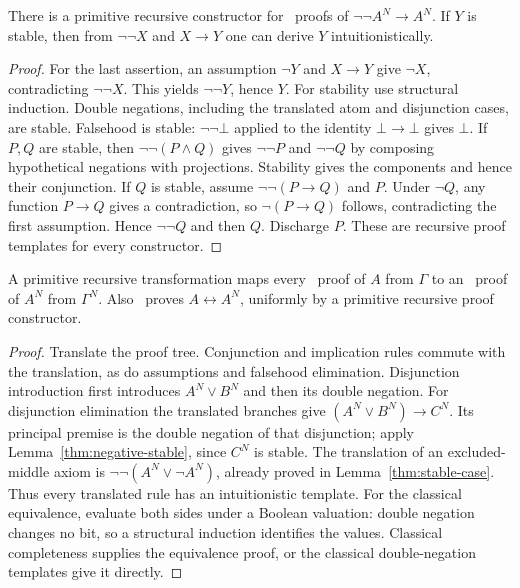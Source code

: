 \begin{lemma}\label{thm:negative-stable}
There is a primitive recursive constructor for \IPC\ proofs of
$\neg\neg A^N\to A^N$. If $Y$ is stable, then from $\neg\neg X$ and
$X\to Y$ one can derive $Y$ intuitionistically.
\end{lemma}
\begin{proof}
For the last assertion, an assumption $\neg Y$ and $X\to Y$ give
$\neg X$, contradicting $\neg\neg X$. This yields $\neg\neg Y$, hence $Y$.
For stability use structural induction. Double negations, including the
translated atom and disjunction cases, are stable. Falsehood is stable:
$\neg\neg\bot$ applied to the identity $\bot\to\bot$ gives $\bot$.
If $P,Q$ are stable, then $\neg\neg(P\wedge Q)$ gives $\neg\neg P$ and
$\neg\neg Q$ by composing hypothetical negations with projections.
Stability gives the components and hence their conjunction.
If $Q$ is stable, assume $\neg\neg(P\to Q)$ and $P$. Under $\neg Q$,
any function $P\to Q$ gives a contradiction, so $\neg(P\to Q)$ follows,
contradicting the first assumption. Hence $\neg\neg Q$ and then $Q$.
Discharge $P$. These are recursive proof templates for every constructor.
\end{proof}

\begin{theorem}\label{thm:negative-translation}
A primitive recursive transformation maps every \CPC\ proof of $A$ from
$\Gamma$ to an \IPC\ proof of $A^N$ from $\Gamma^N$. Also \CPC\ proves
$A\leftrightarrow A^N$, uniformly by a primitive recursive proof constructor.
\end{theorem}
\begin{proof}
Translate the proof tree. Conjunction and implication rules commute with
the translation, as do assumptions and falsehood elimination. Disjunction
introduction first introduces $A^N\vee B^N$ and then its double negation.
For disjunction elimination the translated branches give
$(A^N\vee B^N)\to C^N$. Its principal premise is the double negation of
that disjunction; apply Lemma~\ref{thm:negative-stable}, since $C^N$ is stable.
The translation of an excluded-middle axiom is
$\neg\neg(A^N\vee\neg A^N)$, already proved in
Lemma~\ref{thm:stable-case}. Thus every translated rule has an intuitionistic
template. For the classical equivalence, evaluate both sides under a
Boolean valuation: double negation changes no bit, so a structural induction
identifies the values. Classical completeness supplies the equivalence
proof, or the classical double-negation templates give it directly.
\end{proof}

